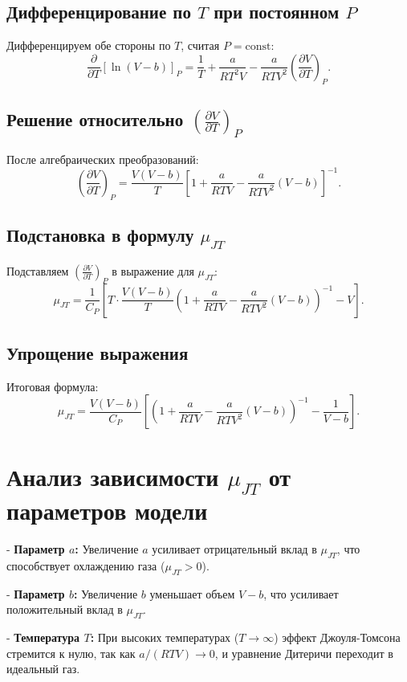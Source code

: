 \documentclass[12pt]{article}
\begin{document}
\subsection{Дифференцирование по $T$ при постоянном $P$}
Дифференцируем обе стороны по $T$, считая $P = \text{const}$:
$$
\frac{\partial}{\partial T} \left[\ln(V - b)\right]_P = \frac{1}{T} + \frac{a}{RT^2V} - \frac{a}{RTV^2} \left(\frac{\partial V}{\partial T}\right)_P.
$$

\subsection{Решение относительно $\left(\frac{\partial V}{\partial T}\right)_P$}
После алгебраических преобразований:
$$
\left(\frac{\partial V}{\partial T}\right)_P = \frac{V(V - b)}{T} \left[1 + \frac{a}{RTV} - \frac{a}{RTV^2}(V - b)\right]^{-1}.
$$

\subsection{Подстановка в формулу $\mu_{JT}$}
Подставляем $\left(\frac{\partial V}{\partial T}\right)_P$ в выражение для $\mu_{JT}$:
$$
\mu_{JT} = \frac{1}{C_P} \left[T \cdot \frac{V(V - b)}{T} \left(1 + \frac{a}{RTV} - \frac{a}{RTV^2}(V - b)\right)^{-1} - V\right].
$$

\subsection{Упрощение выражения}
Итоговая формула:
$$
\mu_{JT} = \frac{V(V - b)}{C_P} \left[ \left(1 + \frac{a}{RTV} - \frac{a}{RTV^2}(V - b)\right)^{-1} - \frac{1}{V - b} \right].
$$

\section{Анализ зависимости $\mu_{JT}$ от параметров модели}

    
- \textbf{Параметр $a$:} Увеличение $a$ усиливает отрицательный вклад в $\mu_{JT}$, что способствует охлаждению газа ($\mu_{JT} > 0$).
    
- \textbf{Параметр $b$:} Увеличение $b$ уменьшает объем $V - b$, что усиливает положительный вклад в $\mu_{JT}$.
    
- \textbf{Температура $T$:} При высоких температурах ($T \to \infty$) эффект Джоуля-Томсона стремится к нулю, так как $a/(RTV) \to 0$, и уравнение Дитеричи переходит в идеальный газ.
\end{document}
